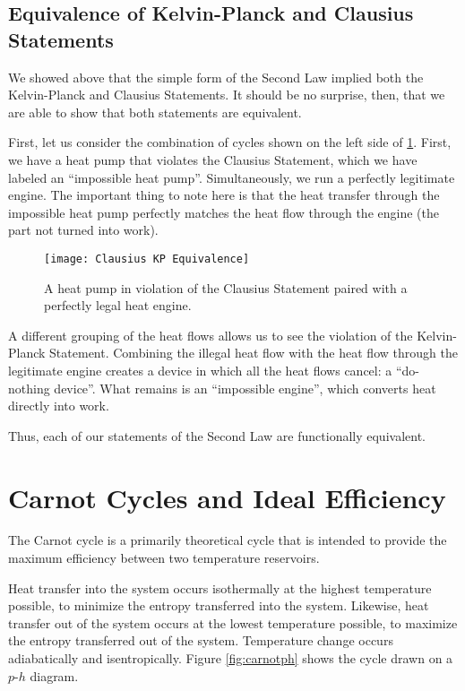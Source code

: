 \subsection{Equivalence of Kelvin-Planck and Clausius Statements}
We showed above that the simple form of the Second Law implied both the Kelvin-Planck and Clausius Statements.  It should be no surprise, then, that we are able to show that both statements are equivalent.

First, let us consider the combination of cycles shown on the left side of \ref{fig:ClausiusEquivalence}.  First, we have a heat pump that violates the Clausius Statement, which we have labeled an ``impossible heat pump''.  Simultaneously, we run a perfectly legitimate engine.  The important thing to note here is that the heat transfer through the impossible heat pump perfectly matches the heat flow through the engine (the part not turned into work).

\begin{figure}[H]
  \centering
  \texttt{[image: Clausius KP Equivalence]}
  \caption{A heat pump in violation of the Clausius Statement paired with a perfectly legal heat engine.}
  \label{fig:ClausiusEquivalence}
\end{figure}

A different grouping of the heat flows allows us to see the violation of the Kelvin-Planck Statement.  Combining the illegal heat flow with the heat flow through the legitimate engine creates a device in which all the heat flows cancel: a ``do-nothing device''.  What remains is an ``impossible engine'', which converts heat directly into work.

Thus, each of our statements of the Second Law are functionally equivalent.

\section{Carnot Cycles and Ideal Efficiency}
The Carnot cycle is a primarily theoretical cycle that is intended to provide the maximum efficiency between two temperature reservoirs.


Heat transfer into the system occurs isothermally at the highest temperature possible, to minimize the entropy transferred into the system.  Likewise, heat transfer out of the system occurs at the lowest temperature possible, to maximize the entropy transferred out of the system.  Temperature change occurs adiabatically and isentropically.  Figure \ref{fig:carnotph} shows the cycle drawn on a $p$-$h$ diagram. %

